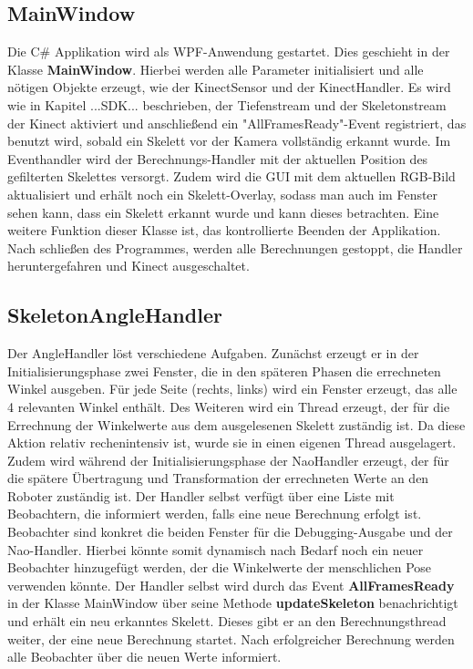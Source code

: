 \subsection{MainWindow}
Die C\# Applikation wird als WPF-Anwendung gestartet. Dies geschieht in der Klasse \textbf{MainWindow}. Hierbei werden alle Parameter initialisiert und alle nötigen Objekte erzeugt, wie der KinectSensor und der KinectHandler. Es wird wie in Kapitel ...SDK... beschrieben, der Tiefenstream und der Skeletonstream der Kinect aktiviert und anschließend ein "AllFramesReady"-Event registriert, das benutzt wird, sobald ein Skelett vor der Kamera vollständig erkannt wurde. Im Eventhandler wird der Berechnungs-Handler mit der aktuellen Position des gefilterten Skelettes versorgt. Zudem wird die GUI mit dem aktuellen RGB-Bild aktualisiert und erhält noch ein Skelett-Overlay, sodass man auch im Fenster sehen kann, dass ein Skelett erkannt wurde und kann dieses betrachten. Eine weitere Funktion dieser Klasse ist, das kontrollierte Beenden der Applikation. Nach schließen des Programmes, werden alle Berechnungen gestoppt, die Handler heruntergefahren und Kinect ausgeschaltet.



\subsection{SkeletonAngleHandler}
Der AngleHandler löst verschiedene Aufgaben. Zunächst erzeugt er in der Initialisierungsphase zwei Fenster, die in den späteren Phasen die errechneten Winkel ausgeben. Für jede Seite (rechts, links) wird ein Fenster erzeugt, das alle 4 relevanten Winkel enthält. Des Weiteren wird ein Thread erzeugt, der für die Errechnung der Winkelwerte aus dem ausgelesenen Skelett zuständig ist. Da diese Aktion relativ rechenintensiv ist, wurde sie in einen eigenen Thread ausgelagert. Zudem wird während der Initialisierungsphase der NaoHandler erzeugt, der für die spätere Übertragung und Transformation der errechneten Werte an den Roboter zuständig ist.
Der Handler selbst verfügt über eine Liste mit Beobachtern, die informiert werden, falls eine neue Berechnung erfolgt ist. Beobachter sind konkret die beiden Fenster für die Debugging-Ausgabe und der Nao-Handler. Hierbei könnte somit dynamisch nach Bedarf noch ein neuer Beobachter hinzugefügt werden, der die Winkelwerte der menschlichen Pose verwenden könnte.
Der Handler selbst wird durch das Event \textbf{AllFramesReady} in der Klasse MainWindow über seine Methode \textbf{updateSkeleton} benachrichtigt und erhält ein neu erkanntes Skelett. Dieses gibt er an den Berechnungsthread weiter, der eine neue Berechnung startet. Nach erfolgreicher Berechnung werden alle Beobachter über die neuen Werte informiert. 

